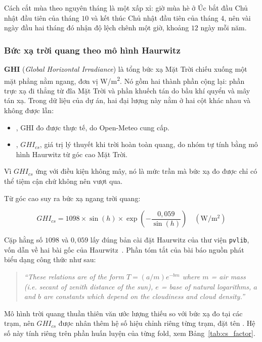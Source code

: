 Cách cắt mùa theo nguyên tháng là một xấp xỉ: giờ mùa hè ở Úc bắt đầu Chủ nhật đầu
tiên của tháng $10$ và kết thúc Chủ nhật đầu tiên của tháng $4$, nên vài ngày đầu hai tháng
đó nhận độ lệch chênh một giờ, khoảng $12$ ngày mỗi năm.

\subsubsection{Bức xạ trời quang theo mô hình Haurwitz}

\textbf{GHI} (\textit{Global Horizontal Irradiance}) là tổng bức xạ Mặt Trời chiếu
xuống một mặt phẳng nằm ngang, đơn vị W/m\textsuperscript{2}. Nó gồm hai thành phần cộng
lại: phần trực xạ đi thẳng từ đĩa Mặt Trời và phần khuếch tán do bầu khí quyển và mây tán
xạ. Trong dữ liệu của dự án, hai đại lượng này nằm ở hai cột khác nhau và không được
lẫn:

\begin{itemize}
    \item {}, GHI đo được thực tế, do Open-Meteo cung cấp.
    \item {}, $GHI_{cs}$, giá trị lý thuyết khi trời hoàn toàn quang, do nhóm
    tự tính bằng mô hình Haurwitz từ góc cao Mặt Trời.
\end{itemize}

Vì $GHI_{cs}$ ứng với điều kiện không mây, nó là mức trần mà bức xạ đo được chỉ có thể tiệm
cận chứ không nên vượt qua.

Từ góc cao suy ra bức xạ ngang trời quang:

\begin{equation}
GHI_{cs} = 1098 \times \sin(h) \times \exp\!\left(-\frac{0{,}059}{\sin(h)}\right)
\quad (\mathrm{W/m^2})
\end{equation}

Cặp hằng số $1098$ và $0{,}059$ lấy đúng bản cài đặt Haurwitz của thư viện \texttt{pvlib},
vốn dẫn về hai bài gốc của Haurwitz~\cite{haurwitz1945}. Phần tóm tắt của bài báo
nguồn phát biểu dạng công thức như sau:

\begin{quote}\small
\textit{``These relations are of the form $T = (a/m)e^{-bm}$ where $m$ = air mass (i.e. secant of zenith distance of the sun), $e$ = base of natural logarithms, $a$ and $b$ are constants which depend on the cloudiness and cloud density.''}
\end{quote}


Mô hình trời quang thuần thiên văn ước lượng thiếu so với bức xạ đo tại các trạm, nên
$GHI_{cs}$ được nhân thêm hệ số hiệu chỉnh riêng từng trạm, đặt tên . Hệ số
này tính riêng trên phần huấn luyện của từng fold, xem Bảng~\ref{tab:cs_factor}.

